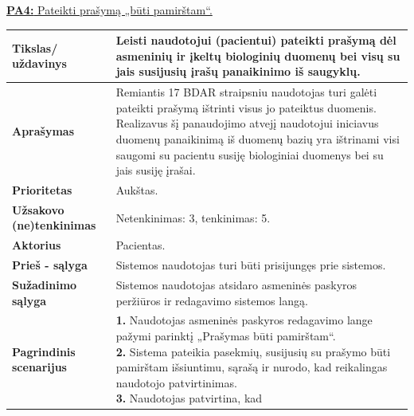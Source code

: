 \documentclass[12pt]{article}
\begin{document}
\newpage

\noindent \hypertarget{FR4}{\hyperlink{PA4}{\textbf{PA4:} Pateikti prašymą
„būti pamirštam“.}}
\label{sec:FR4}
\begin{table}[htb!]
    \captionsetup{justification=centering}
    \begin{tabular}{|m{3cm}|m{13.7cm}|}
        \hline
        \raggedleft \textbf{\cellcolor{deepchampagne}Tikslas/ uždavinys} &
        Leisti naudotojui (pacientui) pateikti prašymą dėl asmeninių ir įkeltų
        biologinių duomenų bei visų su jais susijusių įrašų panaikinimo iš
        saugyklų. \\
        \hline
        \raggedleft \textbf{\cellcolor{deepchampagne}Aprašymas} &
        Remiantis 17 BDAR straipsniu naudotojas turi galėti pateikti prašymą
        ištrinti visus jo pateiktus duomenis. Realizavus šį panaudojimo atvejį
        naudotojui iniciavus duomenų panaikinimą iš duomenų bazių yra ištrinami
        visi saugomi su pacientu susiję biologiniai duomenys bei su jais susiję
        įrašai. \\
        \hline
        \raggedleft \textbf{\cellcolor{deepchampagne}Prioritetas} & Aukštas. \\
        \hline
        \raggedleft \textbf{\cellcolor{deepchampagne}Užsakovo (ne)tenkinimas} &
        Netenkinimas: 3, tenkinimas: 5. \\
        \hline
        \raggedleft \textbf{\cellcolor{deepchampagne}Aktorius} &
        Pacientas. \\
        \hline
        \raggedleft \textbf{\cellcolor{deepchampagne}Prieš - sąlyga} &
        Sistemos naudotojas turi būti prisijungęs prie sistemos. \\
        \hline
        \raggedleft \textbf{\cellcolor{deepchampagne}Sužadinimo sąlyga} &
        Sistemos naudotojas atsidaro asmeninės paskyros peržiūros ir redagavimo
        sistemos langą. \\
        \hline
        \raggedleft \textbf{\cellcolor{deepchampagne}Pagrindinis
        scenarijus} & \vskip 5pt
        \makecell[l]{\parbox[t]{13.7cm}{
            \textbf{1.} \textcolor{dartmouthgreen}{Naudotojas asmeninės paskyros
            redagavimo lange pažymi parinktį „Prašymas būti pamirštam“.} \\
            \textbf{2.} {Sistema pateikia pasekmių,
            susijusių su prašymo būti pamirštam išsiuntimu, sąrašą ir
            nurodo, kad reikalingas naudotojo patvirtinimas.} \\
            \textbf{3.} \textcolor{dartmouthgreen}{Naudotojas patvirtina, kad
}}}
\end{tabular}
\end{table}
\end{document}
